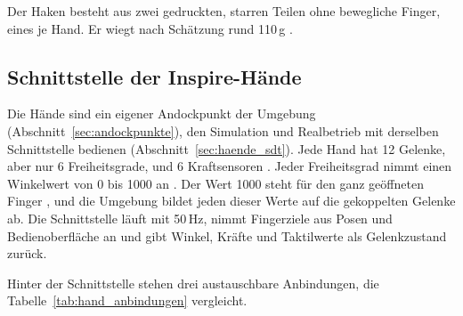 
Der Haken besteht aus zwei gedruckten, starren Teilen ohne bewegliche Finger, eines je Hand.
Er wiegt nach Schätzung rund 110\,g .

\subsection{Schnittstelle der Inspire-Hände}
\label{sec:hand_schnittstelle}
Die Hände sind ein eigener Andockpunkt der Umgebung (Abschnitt~\ref{sec:andockpunkte}), den Simulation und Realbetrieb mit derselben Schnittstelle bedienen (Abschnitt~\ref{sec:haende_sdt}).
Jede Hand hat 12 Gelenke, aber nur 6 Freiheitsgrade, und 6 Kraftsensoren \cite{Inspire2024}.
Jeder Freiheitsgrad nimmt einen Winkelwert von 0 bis 1000 an \cite{Inspire2024}.
Der Wert 1000 steht für den ganz geöffneten Finger \cite{Inspire2024}, und die Umgebung bildet jeden dieser Werte auf die gekoppelten Gelenke ab.
Die Schnittstelle läuft mit 50\,Hz, nimmt Fingerziele aus Posen und Bedienoberfläche an und gibt Winkel, Kräfte und Taktilwerte als Gelenkzustand zurück.

Hinter der Schnittstelle stehen drei austauschbare Anbindungen, die Tabelle~\ref{tab:hand_anbindungen} vergleicht.

